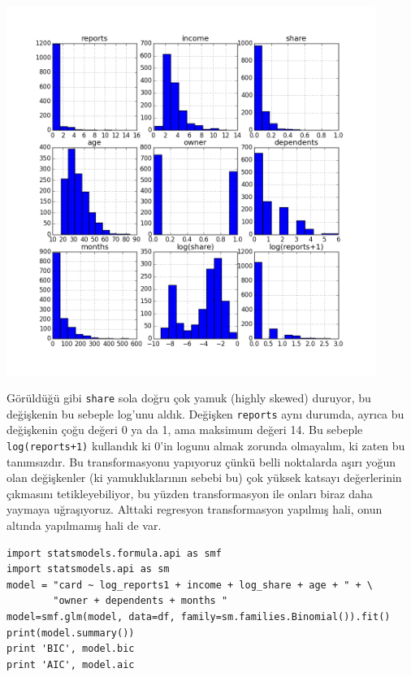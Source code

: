 \documentclass[12pt,fleqn]{article}\usepackage{../../common}
\begin{document}
\includegraphics[height=12cm]{stat_logit_01.png}

Görüldüğü gibi \verb!share! sola doğru çok yamuk (highly skewed) duruyor, bu
değişkenin bu sebeple log'unu aldık. Değişken \verb!reports! aynı durumda,
ayrıca bu değişkenin çoğu değeri 0 ya da 1, ama maksimum değeri 14. Bu sebeple
\verb!log(reports+1)! kullandık ki 0'in logunu almak zorunda olmayalım, ki zaten
bu tanımsızdır. Bu transformasyonu yapıyoruz çünkü belli noktalarda aşırı yoğun
olan değişkenler (ki yamukluklarının sebebi bu) çok yüksek katsayı değerlerinin
çıkmasını tetikleyebiliyor, bu yüzden transformasyon ile onları biraz daha
yaymaya uğraşıyoruz. Alttaki regresyon transformasyon yapılmış hali, onun
altında yapılmamış hali de var.

\begin{verbatim}
import statsmodels.formula.api as smf
import statsmodels.api as sm
model = "card ~ log_reports1 + income + log_share + age + " + \
        "owner + dependents + months "
model=smf.glm(model, data=df, family=sm.families.Binomial()).fit()
print(model.summary())
print 'BIC', model.bic
print 'AIC', model.aic
\end{verbatim}
\end{document}
